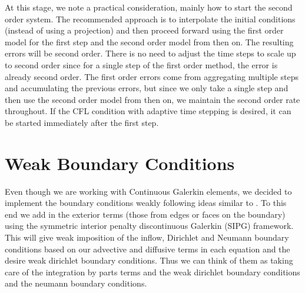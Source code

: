 \documentclass[letterpaper]{erdc}
\begin{document}
\begin{remark}
At this stage, we note a practical consideration, mainly how to start the second order system.  The recommended approach is to interpolate the initial conditions (instead of using a projection) and then proceed forward using the first order model for the first step and the second order model from then on.  The resulting errors will be second order.  There is no need to adjust the time steps to scale up to second order since for a single step of the first order method, the error is already second order.  The first order errors come from aggregating multiple steps and accumulating the previous errors, but since we only take a single step and then use the second order model from then on, we maintain the second order rate throughout.  If the CFL condition with adaptive time stepping is desired, it can be started immediately after the first step.
\end{remark}


%
%
%
\section{Weak Boundary Conditions}\label{sec:WeakBoundaryConditions}
Even though we are working with Continuous Galerkin elements, we decided to implement the boundary conditions weakly following ideas similar to \cite{bazilevs2007weak}.  To this end we add in the exterior terms (those from edges or faces on the boundary) using the symmetric interior penalty discontinuous Galerkin (SIPG) framework.  This will give weak imposition of the inflow, Dirichlet and Neumann boundary conditions based on our advective and diffusive terms in each equation and the desire weak dirichlet boundary conditions.  Thus we can think of them as taking care of the integration by parts terms and the weak dirichlet boundary conditions and the  neumann boundary conditions.
\end{document}
